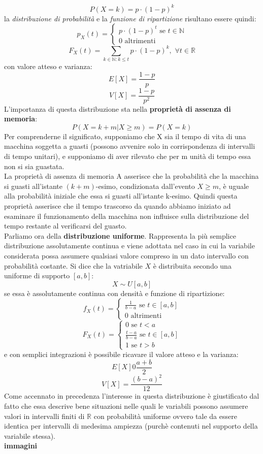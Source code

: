 \documentclass[a4paper,12pt, oneside]{book}
\newcommand{\numberset}{\mathbb}
\newcommand{\R}{\numberset{R}}
\begin{document}
\[P(X=k)=p\cdot (1-p)^k\]
la \textit{distribuzione di probabilità} e la \textit{funzione di ripartizione} risultano essere quindi:
\[p_X(t)=\begin{cases}
p\cdot (1-p)^t \mbox{ se } t\in\mathbb{N}\\
0 \mbox{ altrimenti}
\end{cases}\]
\[F_X(t)=\sum_{k\in\mathbb{N}:k\leq t}p\cdot(1-p)^k,\,\,\forall t\in\R \]
con valore atteso e varianza:
\[E[X]=\frac{1-p}{p}\]
\[V[X]=\frac{1-p}{p^2}\]
L’importanza di questa distribuzione sta nella \textbf{proprietà di assenza di memoria}:
\[P(X=k+m|X\geq m)=P(X=k)\]
Per comprenderne il significato, supponiamo che X sia il tempo di vita di una macchina soggetta a guasti (possono avvenire solo in corrispondenza di intervalli di tempo unitari), e supponiamo di aver rilevato che per m unità di tempo essa non si sia guastata.\\
La proprietà di assenza di memoria A asserisce che la probabilità che la macchina si guasti all’istante $(k+m)$-esimo, condizionata dall’evento $X\geq m$, è uguale alla probabilità iniziale che essa si guasti all’istante k-esimo. Quindi questa proprietà asserisce che il tempo trascorso
da quando abbiamo iniziato ad esaminare il funzionamento della macchina non
influisce sulla distribuzione del tempo restante al verificarsi del guasto.\\
Parliamo ora della \textbf{distribuzione uniforme}. Rappresenta la più semplice distribuzione assolutamente continua e viene adottata
nel caso in cui la variabile considerata possa assumere qualsiasi valore compreso in un dato intervallo con probabilità costante. Si dice che la vatriabile $X$ è distribuita secondo una uniforme di supporto $[a,b]$:
\[X\sim U[a,b]\]
se essa è assolutamente continua con densità e funzione di ripartizione:
\[f_X(t)=\begin{cases}
\frac{1}{b-a} \mbox{ se } t\in[a,b]\\
0 \mbox{ altrimenti}
\end{cases}\]
\[F_X(t)=\begin{cases}
0 \mbox{ se } t<a\\
\frac{t-a}{b-a} \mbox{ se } t\in[a,b]\\
1 \mbox{ se } t> b
\end{cases}\]
e con semplici integrazioni è possibile ricavare il valore atteso e la varianza:
\[E[X]0\frac{a+b}{2}\]
\[V[X]=\frac{(b-a)^2}{12}\]
Come accennato in precedenza l’interesse in questa distribuzione è giustificato dal
fatto che essa descrive bene situazioni nelle quali le variabili possono assumere valori in intervalli finiti di $\R$ con probabilità uniforme ovvero tale da essere identica per intervalli di medesima ampiezza (purchè contenuti nel supporto della variabile stessa).\\
\textbf{immagini}
\\
\end{document}
